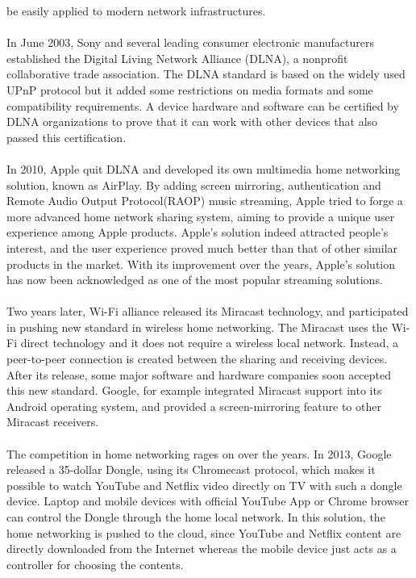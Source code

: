 be easily applied to modern network infrastructures.\\
\\ 
In June 2003, Sony and several leading consumer electronic manufacturers
established the Digital Living Network Alliance (DLNA), a nonprofit 
collaborative trade association. The DLNA standard is based on the widely used UPnP 
protocol but it added some restrictions on media formats and some compatibility 
requirements. A device hardware and software can be certified by DLNA 
organizations to prove that it can work with other devices that also passed 
this certification. \\
\\
In 2010, Apple quit DLNA and developed its own multimedia home networking 
solution, known as AirPlay. By adding screen mirroring, authentication and Remote 
Audio Output Protocol(RAOP) music streaming, Apple tried to forge a more advanced 
home network sharing system, aiming to provide a unique user experience among Apple 
products. Apple's solution indeed attracted people's interest, and the user experience 
proved much better than that of other similar products in the market. With its improvement
 over the years,  Apple's solution has now been acknowledged as one of the most popular streaming 
solutions.\\
\\
Two years later, Wi-Fi alliance released its Miracast technology, and 
participated in pushing new standard in wireless home networking. The Miracast 
uses the Wi-Fi direct technology and it does not require a wireless local 
network. Instead, a peer-to-peer connection is created between the sharing and 
receiving devices. After its release, some major software and hardware 
companies soon accepted this new standard. Google, for example integrated Miracast 
support into its Android operating system, and provided a screen-mirroring feature 
to other Miracast receivers. \\
\\
The competition in home networking rages on over the years. In 2013, Google released a 35-dollar 
Dongle, using its Chromecast protocol, which makes it possible to watch 
YouTube and Netflix video directly on TV with such a dongle device. Laptop and mobile 
devices with official YouTube App or Chrome browser can control the Dongle 
through the home local network. In this solution, the home networking is pushed to the 
cloud, since YouTube and Netflix content are directly downloaded from the Internet whereas the
mobile device just acts as a controller for choosing the contents. \\
